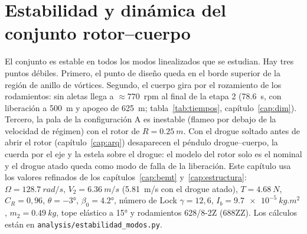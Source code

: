 \chapter{Estabilidad y dinámica del conjunto rotor--cuerpo}\label{cap:estabilidad}

El conjunto es estable en todos los modos linealizados que se estudian. Hay tres puntos
débiles. Primero, el punto de diseño queda en el borde superior de la región de anillo de
vórtices. Segundo, el cuerpo gira por el rozamiento de los rodamientos: sin aletas llega
a $\approx\num{770}$~rpm al final de la etapa 2 (\SI{78.6}{s}, con liberación a \SI{500}{m} y
apogeo de \SI{625}{m}; tabla~\ref{tab:tiempos}, capítulo~\ref{cap:dim}). Tercero, la pala
de la configuración A es inestable (flameo por debajo de la velocidad de régimen) con el rotor de $R=\SI{0.25}{m}$. Con el
drogue soltado antes de abrir el rotor (capítulo~\ref{cap:arq}) desaparecen el péndulo
drogue--cuerpo, la cuerda por el eje y la estela sobre el drogue: el modelo del rotor solo
es el nominal y el drogue atado queda como modo de falla de la liberación. Este capítulo
usa los valores refinados de los capítulos~\ref{cap:bemt} y~\ref{cap:estructura}:
$\Omega=\SI{128.7}{rad/s}$, $V_2=\SI{6.36}{m/s}$ (\SI{5.81}{m/s} con el drogue atado),
$T=\SI{4.68}{N}$, $C_R=0{,}96$, $\theta=\ang{-3}$, $\beta_0=\ang{4.2}$, número de Lock
$\gamma=12{,}6$, $I_b=\SI{9.7e-5}{kg.m^2}$, $m_2=\SI{0.49}{kg}$, tope elástico a \ang{+15}
y rodamientos 628/8-2Z (688ZZ). Los cálculos están en
\texttt{analysis/estabilidad\_modos.py}.

